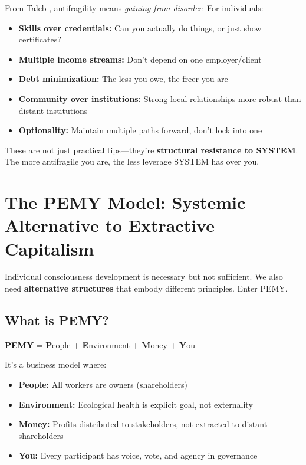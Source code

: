 \documentclass[11pt,a4paper]{article}
\theoremstyle{definition}
\theoremstyle{remark}
\begin{document}
From Taleb \citep{taleb2012antifragile}, antifragility means \textit{gaining from disorder}. For individuals:

\begin{itemize}
    \item \textbf{Skills over credentials:} Can you actually do things, or just show certificates?
    \item \textbf{Multiple income streams:} Don't depend on one employer/client
    \item \textbf{Debt minimization:} The less you owe, the freer you are
    \item \textbf{Community over institutions:} Strong local relationships more robust than distant institutions
    \item \textbf{Optionality:} Maintain multiple paths forward, don't lock into one
\end{itemize}

These are not just practical tips---they're \textbf{structural resistance to SYSTEM}. The more antifragile you are, the less leverage SYSTEM has over you.

\section{The PEMY Model: Systemic Alternative to Extractive Capitalism}

Individual consciousness development is necessary but not sufficient. We also need \textbf{alternative structures} that embody different principles. Enter PEMY.

\subsection{What is PEMY?}

\textbf{PEMY} = \textbf{P}eople + \textbf{E}nvironment + \textbf{M}oney + \textbf{Y}ou

It's a business model where:
\begin{itemize}
    \item \textbf{People:} All workers are owners (shareholders)
    \item \textbf{Environment:} Ecological health is explicit goal, not externality
    \item \textbf{Money:} Profits distributed to stakeholders, not extracted to distant shareholders
    \item \textbf{You:} Every participant has voice, vote, and agency in governance
\end{itemize}
\end{document}
